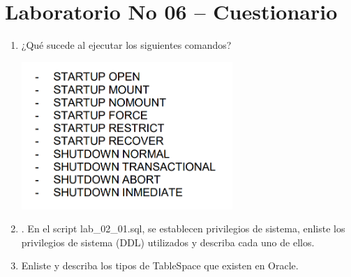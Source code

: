 \section{Laboratorio No 06 – Cuestionario} 

\begin{enumerate}[1.]
	\item ¿Qué sucede al ejecutar los siguientes comandos?
	\begin{center}
	\includegraphics[width=8cm]{./Imagenes/actividad_5_1_lab_06}
	\end{center}	

	\item . En el script lab\_02\_01.sql, se establecen privilegios de sistema, enliste los privilegios de sistema (DDL) utilizados y describa cada uno de ellos.
	
	\item Enliste y describa los tipos de TableSpace que existen en Oracle.
	
	

\end{enumerate} 
